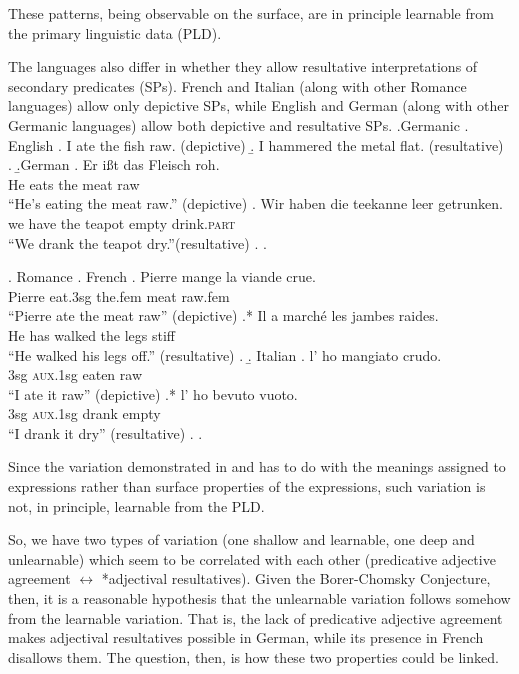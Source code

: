 \documentclass[letterpaper,12pt]{article}
\begin{document}
These patterns, being observable on the surface, are in principle learnable from the primary linguistic data (PLD).

The languages also differ in whether they allow resultative interpretations of secondary predicates (SPs).
French and Italian (along with other Romance languages) allow only depictive SPs, while English and German (along with other Germanic languages) allow both depictive and resultative SPs.
\ex.Germanic
\a. English
\a. I ate the fish raw. (depictive)
\b. I hammered the metal flat. (resultative)
\z.
\b.German 
\ag. Er i\ss{}t das Fleisch roh. \parencite{muller2004analysis}\\
He eats the meat raw { }\\
``He's eating the meat raw.'' (depictive)
\bg. Wir haben die teekanne leer getrunken. \parencite{kratzer_building_2004}\\
we have the teapot empty drink.\textsc{part} { }\\
``We drank the teapot dry.''(resultative)
\z.
\z.

\ex. Romance
\a. French
\ag. Pierre mange la viande crue. \parencite{legendre1997secondary}\\
Pierre eat.3sg the.fem meat raw.fem { }\\
``Pierre ate the meat raw'' (depictive)
\bg.* Il a march\'e les jambes raides. \parencite{washio1997resultatives}\\
He has walked the legs stiff { }\\
``He walked his legs off.'' (resultative)
\z.
\b. Italian
\ag. l' ho mangiato crudo.\\
3sg \textsc{aux}.1sg eaten raw\\
``I ate it raw'' (depictive)
\bg.* l' ho bevuto vuoto.\\
3sg \textsc{aux}.1sg drank empty\\
``I drank it dry'' (resultative)
\z.
\z.

Since the variation demonstrated in \LLast and \Last has to do with the meanings assigned to expressions rather than surface properties of the expressions, such variation is not, in principle, learnable from the PLD.

So, we have two types of variation (one shallow and learnable, one deep and unlearnable) which seem to be correlated with each other (predicative adjective agreement $\leftrightarrow$ *adjectival resultatives).
Given the Borer-Chomsky Conjecture, then, it is a reasonable hypothesis that the unlearnable variation follows somehow from the learnable variation.
That is, the lack of predicative adjective agreement makes adjectival resultatives possible in German, while its presence in French disallows them.
The question, then, is how these two properties could be linked.
\end{document}
